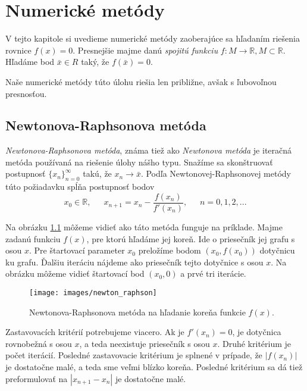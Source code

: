 
\chapter{Numerické metódy}
\label{kap:numeric_methods}

V tejto kapitole si uvedieme numerické metódy zaoberajúce sa hľadaním riešenia rovnice $f(x) = 0$.
Presnejšie majme danú \textit{spojitú funkciu} $f: M \to \mathbb{R}, M \subset \mathbb{R}$. Hľadáme bod
$\bar{x} \in R$ taký, že $f(\bar{x}) = 0$.

Naše numerické metódy túto úlohu riešia len približne, avšak s ľubovoľnou presnosťou.

\section{Newtonova-Raphsonova metóda}

\textit{Newtonova-Raphsonova metóda}, známa tiež ako \textit{Newtonova metóda} je iteračná metóda používaná na riešenie
úlohy nášho typu. Snažíme sa skonštruovať postupnosť $\{x_n\}_{n=0}^\infty$ takú, že $x_n \to \bar{x}$.
Podľa Newtonovej-Raphsonovej metódy túto požiadavku spĺňa postupnosť bodov
$$x_0 \in \mathbb{R}, \,\,\,\,\,\,\,\,\, x_{n+1} = x_n - \frac{f(x_n)}{f'(x_n)}, \,\,\,\,\,\,\,\,\, n = 0, 1, 2, ...$$

Na obrázku \ref{obr:newton_raphson} môžeme vidieť ako táto metóda funguje na príklade. Majme zadanú funkciu
$f(x)$, pre ktorú hľadáme jej koreň. Ide o priesečník jej grafu s osou $x$. Pre štartovací parameter
$x_0$ preložíme bodom $(x_0, f(x_0))$ dotyčnicu ku grafu. Ďalšiu iteráciu nájdeme ako priesečník tejto 
dotyčnice s osou $x$. Na obrázku môžeme vidieť štartovací bod $(x_0, 0)$ a prvé tri iterácie.

\begin{figure}
    \centerline{\texttt{[image: images/newton\_raphson]}}
    \caption[Newtonova-Raphsonova metóda]{Newtonova-Raphsonova metóda na hľadanie koreňa funkcie $f(x)$.}
    \label{obr:newton_raphson}
\end{figure}

Zastavovacích kritérií potrebujeme viacero. Ak je $f'(x_n) = 0$, je dotyčnica rovnobežná
s osou $x$, a teda neexistuje priesečník s osou $x$. Druhé kritérium je počet iterácií. 
Posledné zastavovacie kritérium je splnené v prípade, že $|f(x_n)|$ je dostatočne 
malé, a teda sme veľmi blízko koreňa. Posledné kritérium sa dá tiež preformulovať na $|x_{n+1} - x_n|$ 
je dostatočne malé.

